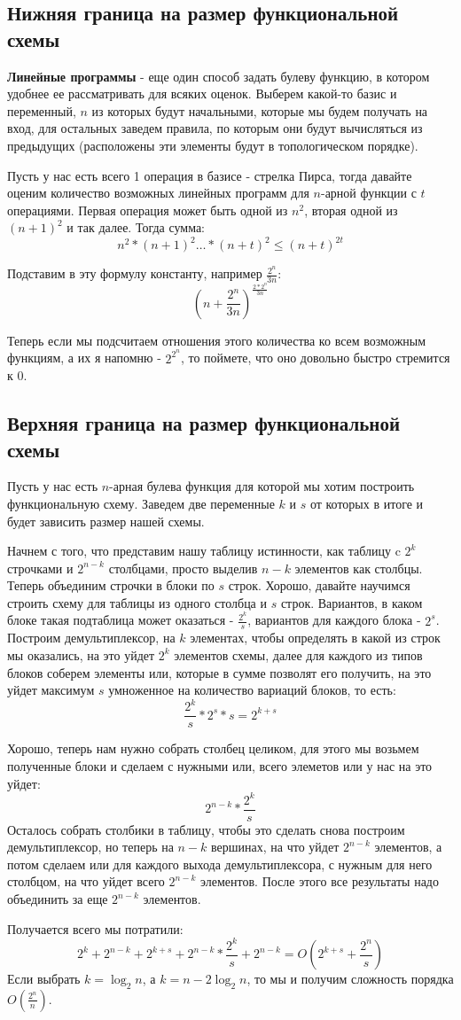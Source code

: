 
\subsection{Нижняя граница на размер функциональной схемы}
\textbf{Линейные программы} - еще один способ задать булеву функцию, в котором удобнее ее рассматривать для всяких оценок. Выберем какой-то базис и переменный, $n$ из которых будут начальными, которые мы будем получать на вход, для остальных заведем правила, по которым они будут вычисляться из предыдущих (расположены эти элементы будут в топологическом порядке).

Пусть у нас есть всего 1 операция в базисе - стрелка Пирса, тогда давайте оценим количество возможных линейных программ для $n$-арной функции с $t$ операциями. Первая операция может быть одной из $n^2$, вторая одной из $(n+1)^2$ и так далее. Тогда сумма: $$n^2*(n+1)^2\dots *(n+t)^2\leq(n+t)^{2t}$$

Подставим в эту формулу константу, например $\frac{2^n}{3n}$: $$\displaystyle\left(n+\frac{2^n}{3n}\right)^{\frac{2*2^n}{3n}}$$

Теперь если мы подсчитаем отношения этого количества ко всем возможным функциям, а их я напомню - $2^{2^n}$, то поймете, что оно довольно быстро стремится к 0.

\subsection{Верхняя граница на размер функциональной схемы}
Пусть у нас есть $n$-арная булева функция для которой мы хотим построить функциональную схему. Заведем две переменные $k$ и $s$ от которых в итоге и будет зависить размер нашей схемы. 

Начнем с того, что представим нашу таблицу истинности, как таблицу c $2^k$ строчками и $2^{n-k}$ столбцами, просто выделив $n-k$ элементов как столбцы. Теперь объединим строчки в блоки по $s$ строк. Хорошо, давайте научимся строить схему для таблицы из одного столбца и $s$ строк. Вариантов, в каком блоке такая подтаблица может оказаться - $\frac{2^k}{s}$, вариантов для каждого блока - $2^s$. Построим демультиплексор, на $k$ элементах, чтобы определять в какой из строк мы оказались, на это уйдет $2^k$ элементов схемы, далее для каждого из типов блоков соберем элементы или, которые в сумме позволят его получить, на это уйдет максимум $s$  умноженное на количество вариаций блоков, то есть: $$\frac{2^k}{s}*2^s*s=2^{k+s}$$

Хорошо, теперь нам нужно собрать столбец целиком, для этого мы возьмем полученные блоки и сделаем с нужными или, всего элеметов или у нас на это уйдет: $$2^{n-k}*\frac{2^k}{s}$$
Осталось собрать столбики в таблицу, чтобы это сделать снова построим демультиплексор, но теперь на $n-k$ вершинах, на что уйдет $2^{n-k}$ элементов, а потом сделаем или для каждого выхода демультиплексора, с нужным для него столбцом, на что уйдет всего $2^{n-k}$ элементов. После этого все результаты надо объединить за еще $2^{n-k}$ элементов.

Получается всего мы потратили: $$2^k+2^{n-k}+2^{k+s}+2^{n-k}*\frac{2^k}{s}+2^{n-k}=O(2^{k+s}+\frac{2^n}{s})$$
Если выбрать $k=\log_2n$, а $k=n-2\log_2n$, то мы и получим сложность порядка $O(\frac{2^n}{n})$.
\